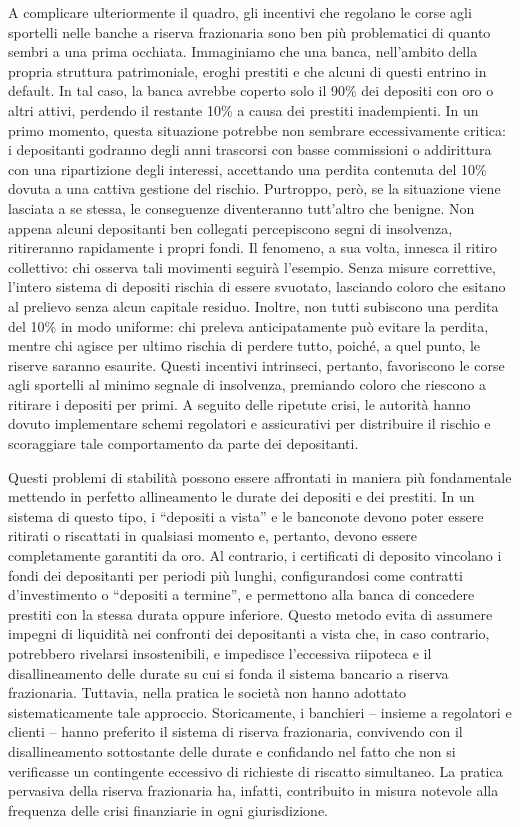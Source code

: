 \documentclass[
  a5paper,
  smalldemyvopaper,10pt,twoside,onecolumn,openright,extrafontsizes,hidelinks]{memoir}
\begin{document}
A complicare ulteriormente il quadro, gli incentivi che regolano le
corse agli sportelli nelle banche a riserva frazionaria sono ben più
problematici di quanto sembri a una prima occhiata. Immaginiamo che una
banca, nell'ambito della propria struttura patrimoniale, eroghi prestiti
e che alcuni di questi entrino in default. In tal caso, la banca avrebbe
coperto solo il 90\% dei depositi con oro o altri attivi, perdendo il
restante 10\% a causa dei prestiti inadempienti. In un primo momento,
questa situazione potrebbe non sembrare eccessivamente critica: i
depositanti godranno degli anni trascorsi con basse commissioni o
addirittura con una ripartizione degli interessi, accettando una perdita
contenuta del 10\% dovuta a una cattiva gestione del rischio. Purtroppo,
però, se la situazione viene lasciata a se stessa, le conseguenze
diventeranno tutt'altro che benigne. Non appena alcuni depositanti ben
collegati percepiscono segni di insolvenza, ritireranno rapidamente i
propri fondi. Il fenomeno, a sua volta, innesca il ritiro collettivo:
chi osserva tali movimenti seguirà l'esempio. Senza misure correttive,
l'intero sistema di depositi rischia di essere svuotato, lasciando
coloro che esitano al prelievo senza alcun capitale residuo. Inoltre,
non tutti subiscono una perdita del 10\% in modo uniforme: chi preleva
anticipatamente può evitare la perdita, mentre chi agisce per ultimo
rischia di perdere tutto, poiché, a quel punto, le riserve saranno
esaurite. Questi incentivi intrinseci, pertanto, favoriscono le corse
agli sportelli al minimo segnale di insolvenza, premiando coloro che
riescono a ritirare i depositi per primi. A seguito delle ripetute
crisi, le autorità hanno dovuto implementare schemi regolatori e
assicurativi per distribuire il rischio e scoraggiare tale comportamento
da parte dei depositanti.

Questi problemi di stabilità possono essere affrontati in maniera più
fondamentale mettendo in perfetto allineamento le durate dei depositi e
dei prestiti. In un sistema di questo tipo, i ``depositi a vista'' e le
banconote devono poter essere ritirati o riscattati in qualsiasi momento
e, pertanto, devono essere completamente garantiti da oro. Al contrario,
i certificati di deposito vincolano i fondi dei depositanti per periodi
più lunghi, configurandosi come contratti d'investimento o ``depositi a
termine'', e permettono alla banca di concedere prestiti con la stessa
durata oppure inferiore. Questo metodo evita di assumere impegni di
liquidità nei confronti dei depositanti a vista che, in caso contrario,
potrebbero rivelarsi insostenibili, e impedisce l'eccessiva riipoteca e
il disallineamento delle durate su cui si fonda il sistema bancario a
riserva frazionaria. Tuttavia, nella pratica le società non hanno
adottato sistematicamente tale approccio. Storicamente, i banchieri --
insieme a regolatori e clienti -- hanno preferito il sistema di riserva
frazionaria, convivendo con il disallineamento sottostante delle durate
e confidando nel fatto che non si verificasse un contingente eccessivo
di richieste di riscatto simultaneo. La pratica pervasiva della riserva
frazionaria ha, infatti, contribuito in misura notevole alla frequenza
delle crisi finanziarie in ogni giurisdizione.
\end{document}
